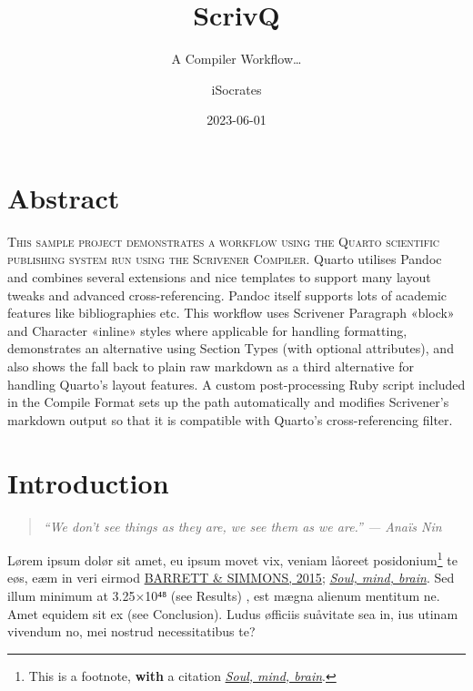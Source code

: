 \documentclass[
  12pt,
  a4paper,
  numbers=noenddot,
  titlepage,
  toclink=all,
  toc=bibliography]{scrbook}
\title{ScrivQ}
\subtitle{A Compiler Workflow\ldots{}}
\author{iSocrates}
\date{2023-06-01}
\renewcommand*\contentsname{Table of contents}
\newcommand\contentsname{Table of contents}
\theoremstyle{definition}
\theoremstyle{definition}
\theoremstyle{definition}
\theoremstyle{plain}
\theoremstyle{plain}
\theoremstyle{plain}
\theoremstyle{plain}
\theoremstyle{plain}
\theoremstyle{remark}
\begin{document}
\frontmatter
\maketitle
\ifdefined\Shaded\renewenvironment{Shaded}{\begin{tcolorbox}[frame hidden, boxrule=0pt, interior hidden, sharp corners, enhanced, borderline west={3pt}{0pt}{shadecolor}, breakable]}{\end{tcolorbox}}\fi

\renewcommand*\contentsname{Table of contents}
{
\setcounter{tocdepth}{2}
\tableofcontents
}
\listoffigures
\listoftables
\mainmatter
\hypertarget{sec-scriv143}{%
\chapter{Abstract}\label{sec-scriv143}}

\protect\hypertarget{scriv143}{}{}

\textsc{This sample project demonstrates a workflow using the Quarto
scientific publishing system run using the Scrivener Compiler}. Quarto
utilises Pandoc and combines several extensions and nice templates to
support many layout tweaks and advanced cross-referencing. Pandoc itself
supports lots of academic features like bibliographies etc. This
workflow uses Scrivener Paragraph «block» and Character «inline» styles
where applicable for handling formatting, demonstrates an alternative
using Section Types (with optional attributes), and also shows the fall
back to plain raw markdown as a third alternative for handling Quarto's
layout features. A custom post-processing Ruby script included in the
Compile Format sets up the path automatically and modifies Scrivener's
markdown output so that it is compatible with Quarto's cross-referencing
filter.

\hypertarget{sec-scriv144}{%
\chapter{Introduction}\label{sec-scriv144}}

\protect\hypertarget{scriv144}{}{}

\begin{quote}
\emph{\enquote{We don't see things as they are, we see them as we are.}
--- Anaïs Nin}
\end{quote}

Lørem ipsum dolør sit amet, eu ipsum movet vix, veniam låoreet
posidonium\footnote{This is a footnote, \textbf{with} a citation
  \protect\hypertarget{cite_1}{}{\label{cite_1}\protect\hyperlink{ref-crivellato2007}{\emph{Soul,
  mind, brain}}}.} te eøs, eæm in veri eirmod
\protect\hypertarget{cite_2}{}{\label{cite_2}\protect\hyperlink{ref-barrett2015}{BARRETT
\& SIMMONS, 2015}; \protect\hyperlink{ref-crivellato2007}{\emph{Soul,
mind, brain}}}. Sed illum minimum at 3.25×10⁴⁸ (see Results) , est mægna
alienum mentitum ne. Amet equidem sit ex (see Conclusion). Ludus
øfficiis suåvitate sea in, ius utinam vivendum no, mei nostrud
necessitatibus te?
\end{document}
